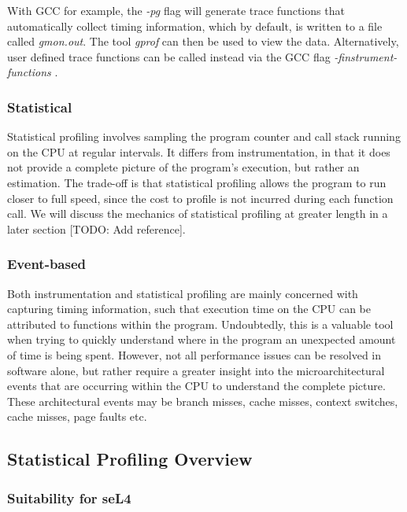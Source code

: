 With GCC for example, the \textit{-pg} flag will generate trace functions that automatically collect timing information, which by default, is written to a file called \textit{gmon.out}. The tool \textit{gprof} can then be used to view the data. Alternatively, user defined trace functions can be called instead via the GCC flag \textit{-finstrument-functions} \cite{ManGCC}. 

\subsubsection{Statistical}\label{sect:statistical}

Statistical profiling involves sampling the program counter and call stack running on the CPU at regular intervals. It differs from instrumentation, in that it does not provide a complete picture of the program's execution, but rather an estimation. The trade-off is that statistical profiling allows the program to run closer to full speed, since the cost to profile is not incurred during each function call. We will discuss the mechanics of statistical profiling at greater length in a later section [TODO: Add reference].

\subsubsection{Event-based}

Both instrumentation and statistical profiling are mainly concerned with capturing timing information, such that execution time on the CPU can be attributed to functions within the program. Undoubtedly, this is a valuable tool when trying to quickly understand where in the program an unexpected amount of time is being spent. However, not all performance issues can be resolved in software alone, but rather require a greater insight into the microarchitectural events that are occurring within the CPU to understand the complete picture. These architectural events may be branch misses, cache misses, context switches, cache misses, page faults etc. 

\subsection{Statistical Profiling Overview}\label{sect:statistical_profiling}

\subsubsection{Suitability for seL4}

